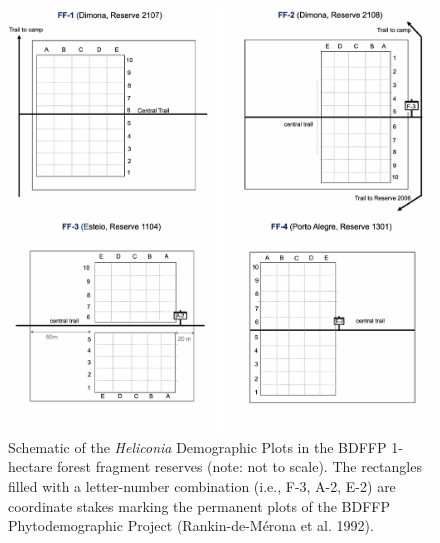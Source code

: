 \documentclass[
  12pt,
  man, donotrepeattitle,floatsintext]{apa6}
\begin{document}
\newpage

\begin{figure}[h]

{\centering \includegraphics{Bruna_etal_MetadataS1_files/figure-latex/plotsone-1} 

}

\caption{Schematic of the \textit{Heliconia} Demographic Plots in the BDFFP 1-hectare forest fragment reserves (note: not to scale). The rectangles filled with a letter-number combination (i.e., F-3, A-2, E-2) are coordinate stakes marking the permanent plots of the BDFFP Phytodemographic Project (Rankin-de-Mérona et al. 1992).}\label{fig:plotsone}
\end{figure}
\end{document}
